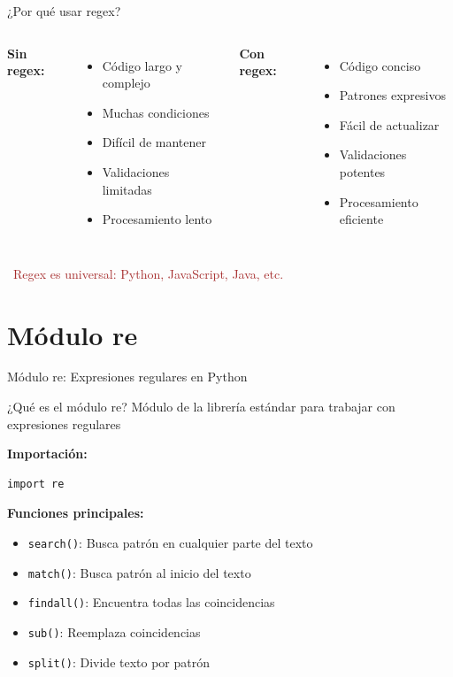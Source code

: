 \documentclass{beamer}
\begin{document}
\begin{frame}{¿Por qué usar regex? \faQuestion}
\begin{columns}[T]
\textbf{Sin regex:} \faTimesCircle
\small
\begin{itemize}
    \item Código largo y complejo
    \item Muchas condiciones
    \item Difícil de mantener
    \item Validaciones limitadas
    \item Procesamiento lento
\end{itemize}

\textbf{Con regex:} \faCheckCircle
\small
\begin{itemize}
    \item Código conciso
    \item Patrones expresivos
    \item Fácil de actualizar
    \item Validaciones potentes
    \item Procesamiento eficiente
\end{itemize}
\end{columns}

\vspace{0.3cm}
\begin{center}
\textcolor{brown}{\faInfoCircle\ Regex es universal: Python, JavaScript, Java, etc.}
\end{center}
\end{frame}

\section{Módulo re}

\begin{frame}[fragile]{Módulo re: Expresiones regulares en Python \faPython}
\begin{conceptbox}{¿Qué es el módulo re?}
Módulo de la librería estándar para trabajar con expresiones regulares
\end{conceptbox}

\textbf{Importación:}
\begin{lstlisting}
import re
\end{lstlisting}

\vspace{0.2cm}
\textbf{Funciones principales:}
\small
\begin{itemize}
    \item[\faSearch] \texttt{search()}: Busca patrón en cualquier parte del texto
    \item[\faAlignLeft] \texttt{match()}: Busca patrón al inicio del texto
    \item[\faListUl] \texttt{findall()}: Encuentra todas las coincidencias
    \item[\faExchangeAlt] \texttt{sub()}: Reemplaza coincidencias
    \item[\faCut] \texttt{split()}: Divide texto por patrón
\end{itemize}
\end{frame}
\end{document}

